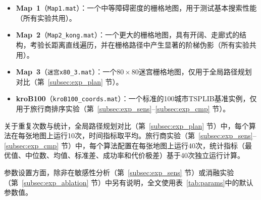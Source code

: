\documentclass[lettersize,journal]{IEEEtran}
\begin{document}
\begin{itemize}

\item \textbf{Map~1}（\texttt{Map1.mat}）：一个中等障碍密度的栅格地图，用于测试基本搜索性能（所有实验共用）。

\item \textbf{Map~2}（\texttt{Map2\_kong.mat}）：一个更大的栅格地图，具有开阔、走廊式的结构，考验长距离直线遍历，并在栅格路径中产生显著的阶梯伪影（所有实验共用）。

\item \textbf{Map~3}（\texttt{迷宫x80\_3.mat}）：一个$80\times 80$迷宫栅格地图，仅用于全局路径规划对比（第~\ref{subsec:exp_plan} 节）。

\item \textbf{kroB100}（\texttt{kroB100\_coords.mat}）：一个标准的100城市TSPLIB基准实例，仅用于旅行商排序实验（第~\ref{subsec:exp_sens}--\ref{subsec:exp_cmp} 节）。

\end{itemize}

关于重复次数与统计，全局路径规划对比（第~\ref{subsec:exp_plan} 节）中，每个算法在每张地图上运行10次，时间指标取平均。旅行商实验（第~\ref{subsec:exp_sens}--\ref{subsec:exp_cmp} 节）中，每个算法配置在每张地图上运行40次，统计指标（最优值、中位数、均值、标准差、成功率和代价极差）基于40次独立运行计算。

参数设置方面，除非在敏感性分析（第~\ref{subsec:exp_sens} 节）或消融实验（第~\ref{subsec:exp_ablation} 节）中另有说明，全文使用表~\ref{tab:params}中的默认参数值。
\end{document}
